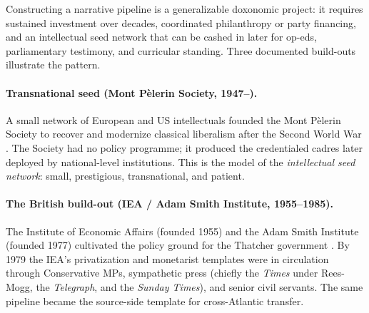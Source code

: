\begin{example}
\label{ex:building-infrastructure}
Constructing a narrative pipeline is a generalizable doxonomic project: it requires sustained investment over decades, coordinated philanthropy or party financing, and an intellectual seed network that can be cashed in later for op-eds, parliamentary testimony, and curricular standing.
Three documented build-outs illustrate the pattern.

\paragraph{Transnational seed (Mont P\`elerin Society, 1947--).}
A small network of European and US intellectuals founded the Mont P\`elerin Society to recover and modernize classical liberalism after the Second World War \autocite{mirowski2009, plehwe2006}.
The Society had no policy programme; it produced the credentialed cadres later deployed by national-level institutions.
This is the model of the \emph{intellectual seed network}: small, prestigious, transnational, and patient.

\paragraph{The British build-out (IEA / Adam Smith Institute, 1955--1985).}
The Institute of Economic Affairs (founded 1955) and the Adam Smith Institute (founded 1977) cultivated the policy ground for the Thatcher government \autocite{cockett1994, stedmanjones2012}.
By 1979 the IEA's privatization and monetarist templates were in circulation through Conservative MPs, sympathetic press (chiefly the \textit{Times} under Rees-Mogg, the \textit{Telegraph}, and the \textit{Sunday Times}), and senior civil servants.
The same pipeline became the source-side template for cross-Atlantic transfer.


\end{example}
